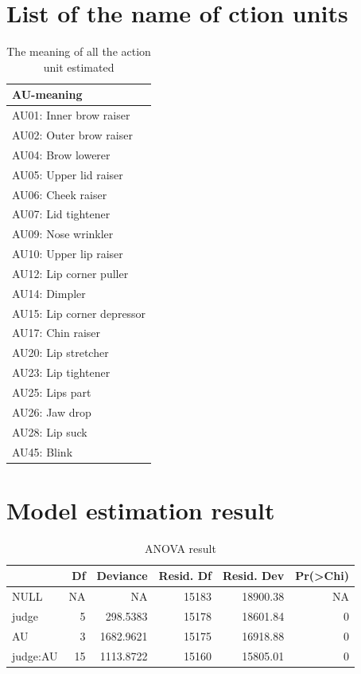 \documentclass{monashthesis}
\begin{document}
\hypertarget{list-of-the-name-of-ction-units}{%
\section{List of the name of ction units}\label{list-of-the-name-of-ction-units}}

\begin{table}[ht]
\begin{center}
\caption{\label{tab:au_meaning} The meaning of all the action unit estimated}
\begin{tabular}{l}
\toprule
AU-meaning \\
\midrule
AU01: Inner brow raiser \\
AU02: Outer brow raiser \\
AU04: Brow lowerer \\
AU05: Upper lid raiser \\
AU06: Cheek raiser \\
AU07: Lid tightener \\
AU09: Nose wrinkler \\
AU10: Upper lip raiser \\
AU12: Lip corner puller \\
AU14: Dimpler \\
AU15: Lip corner depressor \\
AU17: Chin raiser \\
AU20: Lip stretcher \\
AU23: Lip tightener \\
AU25: Lips part \\
AU26: Jaw drop \\
AU28: Lip suck \\
AU45: Blink \\
\bottomrule
\end{tabular}
\end{center}
\end{table}

\hypertarget{model-estimation-result}{%
\section{Model estimation result}\label{model-estimation-result}}

\begin{table}[t]

\caption{\label{tab:anova}\label{tab:anova}ANOVA result}
\centering
\begin{tabular}{l|r|r|r|r|r}
\hline
  & Df & Deviance & Resid. Df & Resid. Dev & Pr(>Chi)\\
\hline
NULL & NA & NA & 15183 & 18900.38 & NA\\
\hline
judge & 5 & 298.5383 & 15178 & 18601.84 & 0\\
\hline
AU & 3 & 1682.9621 & 15175 & 16918.88 & 0\\
\hline
judge:AU & 15 & 1113.8722 & 15160 & 15805.01 & 0\\
\hline
\end{tabular}
\end{table}
\end{document}
